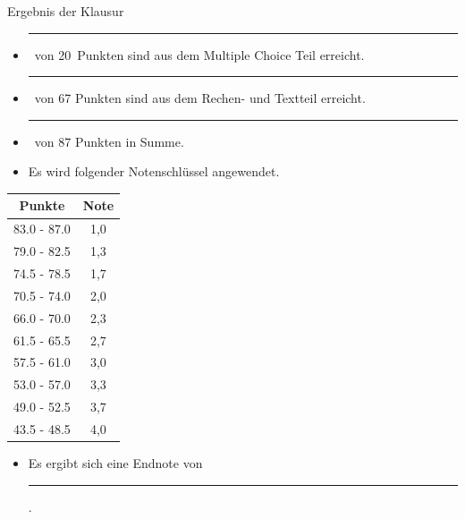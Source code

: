 \documentclass[a4paper, 9pt]{scrartcl}\usepackage[]{graphicx}\usepackage[]{xcolor}
\begin{document}
\begin{graybox}{Ergebnis der Klausur}
  \vspace{1Ex}
  \begin{itemize}
  \item[] \rule[0ex]{3em}{.4pt}\, von 20\, Punkten sind aus dem Multiple
    Choice Teil erreicht.
  \item[] \rule[0ex]{3em}{.4pt}\, von 67 Punkten sind aus dem Rechen- und
    Textteil erreicht. 
  \item[] \rule[0ex]{3em}{.4pt}\, von 87 Punkten in Summe.
  \item[] Es wird folgender Notenschl{\"u}ssel angewendet.   
  \end{itemize}
  \vspace{1ex}
\begin{center}
  \begin{tabular}[c]{cc}
    \toprule
    \textbf{Punkte}	&	\textbf{Note}	\\
    \midrule
    83.0 - 87.0	&	1,0	\\
    79.0 - 82.5	&	1,3	\\
    74.5 - 78.5	&	1,7	\\
    70.5 - 74.0	&	2,0	\\
    66.0 - 70.0	&	2,3	\\
    61.5 - 65.5	&	2,7	\\
    57.5 - 61.0	&	3,0	\\
    53.0 - 57.0	&	3,3	\\
    49.0 - 52.5	&	3,7	\\
    43.5 - 48.5	&	4,0	\\
    \bottomrule
  \end{tabular}
\end{center}
  \vspace{1ex}
\begin{itemize}
\item[] Es ergibt sich eine Endnote von \rule[0ex]{4em}{.4pt}.
\end{itemize}
  \vspace{1Ex}
\end{graybox}

\newpage
\end{document}
